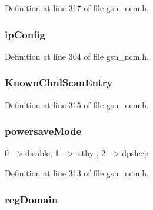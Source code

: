 Definition at line 317 of file gsn\_\-ncm.h.

\hypertarget{a00157_a1dede6b9b16f28827ae79e82aba27440}{
\subsubsection[{ipConfig}]{ {\bf ipConfig}}}
\label{a00157_a1dede6b9b16f28827ae79e82aba27440}


Definition at line 304 of file gsn\_\-ncm.h.

\hypertarget{a00157_ab2c5c65b950489ba05abaaaf0036f231}{
\subsubsection[{KnownChnlScanEntry}]{ {\bf KnownChnlScanEntry}}}
\label{a00157_ab2c5c65b950489ba05abaaaf0036f231}


Definition at line 315 of file gsn\_\-ncm.h.

\hypertarget{a00157_a6044064a1512395f0f8f1d181c541601}{
\subsubsection[{powersaveMode}]{ {\bf powersaveMode}}}
\label{a00157_a6044064a1512395f0f8f1d181c541601}
0-\/-\/$>$disable, 1-\/-\/$>$ stby , 2-\/-\/$>$dpsleep 

Definition at line 313 of file gsn\_\-ncm.h.

\hypertarget{a00157_aa383b54497e68623f36213827ac7e5c8}{
\subsubsection[{regDomain}]{ {\bf regDomain}}}
\label{a00157_aa383b54497e68623f36213827ac7e5c8}


